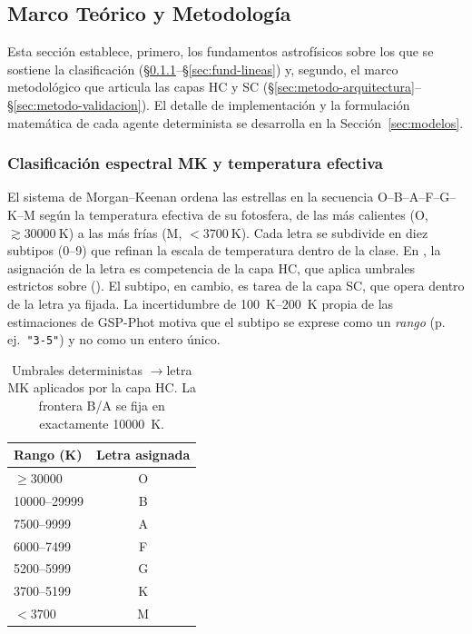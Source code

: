 \subsection{Marco Teórico y Metodología}
\label{sec:marco-teorico}

Esta sección establece, primero, los fundamentos astrofísicos sobre los que se
sostiene la clasificación (§\ref{sec:fund-mk}--§\ref{sec:fund-lineas}) y, segundo,
el marco metodológico que articula las capas HC y SC
(§\ref{sec:metodo-arquitectura}--§\ref{sec:metodo-validacion}). El detalle de
implementación y la formulación matemática de cada agente determinista se
desarrolla en la Sección~\ref{sec:modelos}.

\subsubsection{Clasificación espectral MK y temperatura efectiva}
\label{sec:fund-mk}

El sistema de Morgan--Keenan ordena las estrellas en la secuencia
O--B--A--F--G--K--M según la temperatura efectiva \teff{} de su fotosfera, de las
más calientes (O, $\gtrsim\SI{30000}{\kelvin}$) a las más frías
(M, $<\SI{3700}{\kelvin}$). Cada letra se subdivide en diez subtipos (0--9) que
refinan la escala de temperatura dentro de la clase. En \STELLAR{}, la asignación
de la letra es competencia de la capa HC, que aplica umbrales estrictos sobre
\teff{} (). El subtipo, en cambio, es tarea de la capa SC,
que opera dentro de la letra ya fijada. La incertidumbre de
\SIrange{100}{200}{\kelvin} propia de las estimaciones \teff{} de GSP-Phot motiva
que el subtipo se exprese como un \emph{rango} (p.\,ej.\ \texttt{"3-5"}) y no como
un entero único.

\begin{table}[H]
  \centering
  \caption{Umbrales deterministas \teff{}$\rightarrow$letra MK aplicados por la
  capa HC. La frontera B/A se fija en exactamente \SI{10000}{\kelvin}.}
  \label{tab:teff-letra}
  \begin{tabular}{lc}
    \toprule
    Rango \teff{} (K) & Letra asignada \\
    \midrule
    $\ge \num{30000}$        & O \\
    \numrange{10000}{29999}  & B \\
    \numrange{7500}{9999}    & A \\
    \numrange{6000}{7499}    & F \\
    \numrange{5200}{5999}    & G \\
    \numrange{3700}{5199}    & K \\
    $< \num{3700}$           & M \\
    \bottomrule
  \end{tabular}
\end{table}

